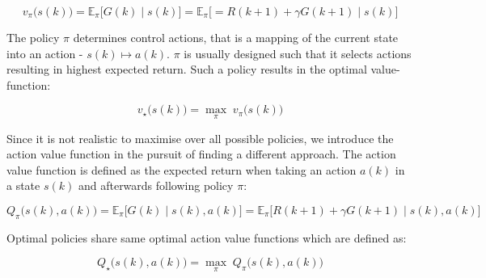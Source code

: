 \begin{equation}\label{eq:IntroVfunc}
	v_{\pi}\bigg(s(k)\bigg)=\mathbb{E}_{\pi}\bigg[ G(k) \; \big|  \; s(k)\bigg]
	=\mathbb{E}_{\pi}\bigg[=R(k+1)+\gamma G(k+1) \; \big| \; s(k)\bigg]
\end{equation}

The policy $ \pi $ determines control actions, that is a mapping of the current state into an action - $ s(k) \mapsto a(k) $. $\pi$ is usually designed such that it selects actions resulting in highest expected return. Such a policy results in the optimal value-function:


\begin{equation}
	v_{\star}\bigg(s(k)\bigg)=\underset{\pi}{\max} \; v_{\pi}\bigg(s(k)\bigg)
\end{equation}

Since it is not realistic to maximise over all possible policies, we introduce the action value function in the pursuit of finding a different approach. The action value function is defined as the expected return when taking an action $ a(k) $ in a state $s(k)$ and afterwards following policy $\pi$:


\begin{equation}\label{eq:IntroQfunc}
	Q_{\pi}\bigg(s(k),a(k)\bigg)=\mathbb{E}_{\pi}\bigg[ G(k) \; \big| \; s(k),a(k) \bigg]
	=\mathbb{E}_{\pi}\bigg[ R(k+1)+\gamma G(k+1) \; \big| \; s(k),a(k)\bigg]
\end{equation}

Optimal policies share same optimal action value functions which are defined as:


\begin{equation}
	Q_{\star}\bigg(s(k),a(k)\bigg)=\underset{\pi}{\max} \; Q_{\pi}\bigg(s(k),a(k)\bigg)
\end{equation}

